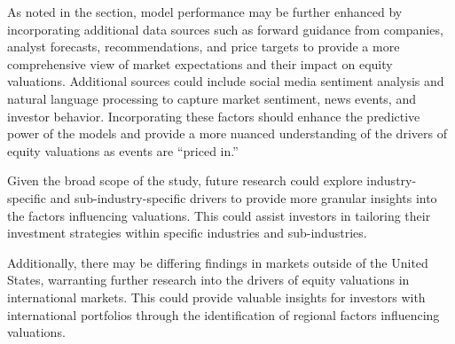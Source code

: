 \documentclass[12pt,a4paper,english]{article}
\begin{document}
As noted in the  section, model performance may be further enhanced by incorporating additional data sources such as forward guidance from companies, analyst forecasts, recommendations, and price targets to provide a more comprehensive view of market expectations and their impact on equity valuations. Additional sources could include social media sentiment analysis and natural language processing to capture market sentiment, news events, and investor behavior. Incorporating these factors should enhance the predictive power of the models and provide a more nuanced understanding of the drivers of equity valuations as events are \enquote{priced in.}

Given the broad scope of the study, future research could explore industry-specific and sub-industry-specific drivers to provide more granular insights into the factors influencing valuations. This could assist investors in tailoring their investment strategies within specific industries and sub-industries.

Additionally, there may be differing findings in markets outside of the United States, warranting further research into the drivers of equity valuations in international markets. This could provide valuable insights for investors with international portfolios through the identification of regional factors influencing valuations.


\raggedright
\clearpage
\nocite{*}



\clearpage
\renewcommand\thetable{\thesection\arabic{table}}
\renewcommand\thefigure{\thesection\arabic{figure}}

\appendix
{}
\setcounter{secnumdepth}{2}
\end{document}
